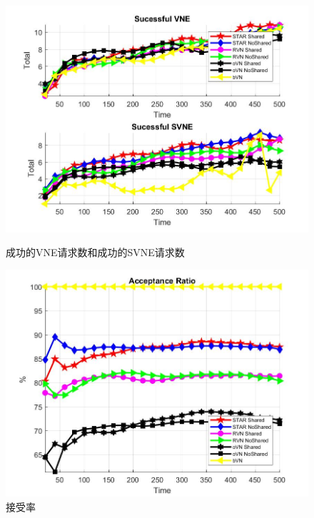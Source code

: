 \begin{figure}[htbp]
\centering
\begin{minipage}{0.4\textwidth}
\centering
\includegraphics[width=\textwidth]{figures/VirNetReqSurNetReq}
\caption{成功的VNE请求数和成功的SVNE请求数}\label{fig:VirNetReqSurNetReq}
\end{minipage}
\begin{minipage}{0.4\textwidth}
\centering
\includegraphics[width=\textwidth]{figures/AcceptionRatio}
\caption{接受率}\label{fig:AcceptionRatio}
\end{minipage}\vspace{\baselineskip}
\end{figure}

